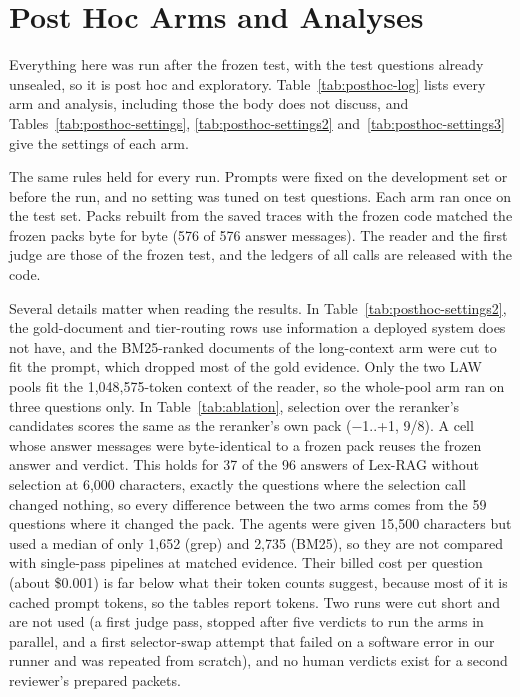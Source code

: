 \section{Post Hoc Arms and Analyses}
\label{app:posthoc}

Everything here was run after the frozen test, with the test questions already unsealed, so it is post hoc and exploratory. Table~\ref{tab:posthoc-log} lists every arm and analysis, including those the body does not discuss, and Tables~\ref{tab:posthoc-settings}, \ref{tab:posthoc-settings2} and~\ref{tab:posthoc-settings3} give the settings of each arm.

The same rules held for every run. Prompts were fixed on the development set or before the run, and no setting was tuned on test questions. Each arm ran once on the test set. Packs rebuilt from the saved traces with the frozen code matched the frozen packs byte for byte (576 of 576 answer messages). The reader and the first judge are those of the frozen test, and the ledgers of all calls are released with the code.




Several details matter when reading the results. In Table~\ref{tab:posthoc-settings2}, the gold-document and tier-routing rows use information a deployed system does not have, and the BM25-ranked documents of the long-context arm were cut to fit the prompt, which dropped most of the gold evidence. Only the two LAW pools fit the 1,048,575-token context of the reader, so the whole-pool arm ran on three questions only. In Table~\ref{tab:ablation}, selection over the reranker's candidates scores the same as the reranker's own pack ($-$1..+1, 9/8). A cell whose answer messages were byte-identical to a frozen pack reuses the frozen answer and verdict. This holds for 37 of the 96 answers of Lex-RAG without selection at 6,000 characters, exactly the questions where the selection call changed nothing, so every difference between the two arms comes from the 59 questions where it changed the pack. The agents were given 15,500 characters but used a median of only 1,652 (grep) and 2,735 (BM25), so they are not compared with single-pass pipelines at matched evidence. Their billed cost per question (about \$0.001) is far below what their token counts suggest, because most of it is cached prompt tokens, so the tables report tokens. Two runs were cut short and are not used (a first judge pass, stopped after five verdicts to run the arms in parallel, and a first selector-swap attempt that failed on a software error in our runner and was repeated from scratch), and no human verdicts exist for a second reviewer's prepared packets.


